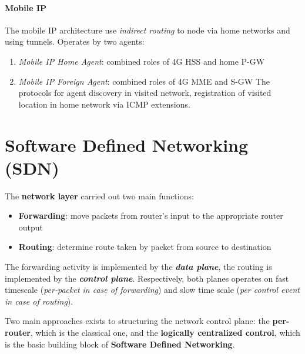 \documentclass[10pt,a4paper]{report}
\theoremstyle{definition}
\begin{document}
\subsubsection{Mobile IP}\label{sec:mobile-ip}
The mobile IP architecture use \textit{indirect routing} to node via home networks and using tunnels. Operates by two agents:
\begin{enumerate}
	\item 
	\textit{Mobile IP Home Agent}: combined roles of 4G HSS and home P-GW
	\item 
	\textit{Mobile IP Foreign Agent}: combined roles of 4G MME and S-GW
	The protocols for agent discovery in visited network, registration of visited location in home network via ICMP extensions.
\end{enumerate}

\chapter{Software Defined Networking (SDN)}
\label{sec:sdn---software-defined-networking}
The \textbf{network layer} carried out two main functions:
\begin{itemize}
	\item 
	\textbf{Forwarding}: move packets from router's input to the appropriate router output
	\item 
	\textbf{Routing}: determine route taken by packet from source to destination

\end{itemize}
	The forwarding activity is implemented by the \textit{\textbf{data plane}}, the routing is implemented by the \textit{\textbf{control plane}}. Respectively, both planes operates on fast timescale (\textit{per-packet in case of forwarding}) and slow time scale (\textit{per control event in case of routing}).

Two main approaches exists to structuring the network control plane: the \textbf{per-router}, which is the classical one, and the \textbf{logically centralized control}, which is the basic building block of \textbf{Software Defined Networking}.
\end{document}
